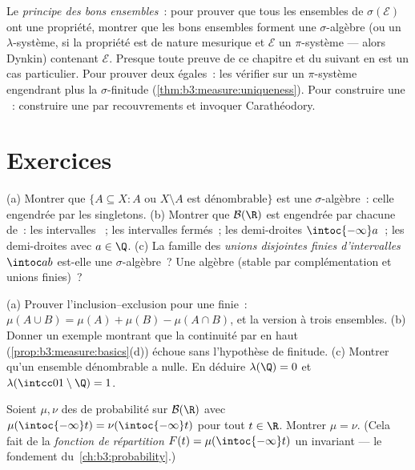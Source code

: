 \begin{method}\label{met:b3:measure:goodsets}
Le \emph{principe des bons ensembles}~: pour prouver que tous
les ensembles de $\sigma(\mathcal E)$ ont une propriété,
montrer que les bons ensembles forment une $\sigma$-algèbre
(ou un $\lambda$-système, si la propriété est de nature
mesurique et $\mathcal E$ un $\pi$-système --- alors Dynkin)
contenant $\mathcal E$. Presque toute preuve de ce chapitre
et du suivant en est un cas particulier. Pour prouver deux
 égales~: les vérifier sur un $\pi$-système engendrant
plus la $\sigma$-finitude
(\cref{thm:b3:measure:uniqueness}). Pour construire une
~: construire une  par
recouvrements et invoquer Carathéodory.
\end{method}

\section{Exercices}

\begin{exercise}[$\star$]\label{exo:b3:measure:1}
(a) Montrer que $\{A \subseteq X : A$ ou $X\setminus A$ est
dénombrable$\}$ est une $\sigma$-algèbre~: celle engendrée
par les singletons.
(b) Montrer que $\mathcal B(\R)$ est engendrée par chacune
de~: les intervalles ~; les intervalles fermés~; les
demi-droites $\intoc{-\infty}a$~; les demi-droites avec $a
\in \Q$.
(c) La famille des \emph{unions disjointes finies
d'intervalles} $\intoc ab$ est-elle une $\sigma$-algèbre~?
Une algèbre (stable par complémentation et unions finies)~?
\end{exercise}

\begin{exercise}[$\star$]\label{exo:b3:measure:2}
(a) Prouver l'inclusion--exclusion pour une  finie~:
$\mu(A\cup B) = \mu(A) + \mu(B) - \mu(A\cap B)$, et la
version à trois ensembles.
(b) Donner un exemple montrant que la continuité par en haut
(\cref{prop:b3:measure:basics}(d)) échoue sans l'hypothèse
de finitude.
(c) Montrer qu'un ensemble dénombrable a 
nulle. En déduire $\lambda(\Q) = 0$ et
$\lambda(\intcc01\setminus\Q) = 1$.
\end{exercise}

\begin{exercise}[$\star\star$]\label{exo:b3:measure:3}
Soient $\mu, \nu$ des  de probabilité sur $\mathcal
B(\R)$ avec $\mu(\intoc{-\infty}t) = \nu(\intoc{-\infty}t)$
pour tout $t \in \R$. Montrer $\mu = \nu$. (Cela fait de la
\emph{fonction de répartition} $F(t) = \mu(\intoc{-\infty}t)$
un invariant  --- le fondement
du~\cref{ch:b3:probability}.)
\end{exercise}


